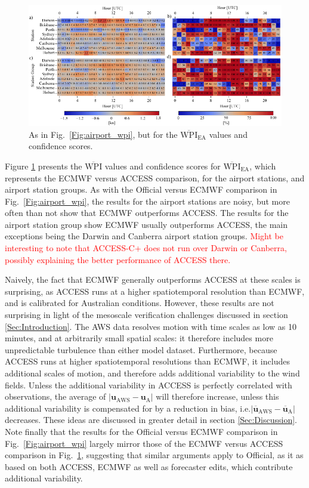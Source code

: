 \documentclass{ametsoc}
\begin{document}
\begin{figure}
\centering
\includegraphics[width=39pc]{airport_wpi_EA.pdf}
\caption{As in Fig.~\ref{Fig:airport_wpi}, but for the $\overline{\text{WPI}}_\text{EA}$ values and confidence scores.}
\label{Fig:airport_wpi_EA}
\end{figure}

Figure \ref{Fig:airport_wpi_EA} presents the $\overline{\text{WPI}}$ values and confidence scores for $\overline{\text{WPI}}_\text{EA}$, which represents the ECMWF versus ACCESS comparison, for the airport stations, and airport station groups. As with the Official versus ECMWF comparison in Fig.~\ref{Fig:airport_wpi}, the results for the airport stations are noisy, but more often than not show that ECMWF outperforms ACCESS. The results for the airport station group show ECMWF usually outperforms ACCESS, the main exceptions being the Darwin and Canberra airport station groups. \textcolor{red}{Might be interesting to note that ACCESS-C+ does not run over Darwin or Canberra, possibly explaining the better performance of ACCESS there.}

Naively, the fact that ECMWF generally outperforms ACCESS at these scales is surprising, as ACCESS runs at a higher spatiotemporal resolution than ECMWF, and is calibrated for Australian conditions. However, these results are not surprising in light of the mesoscale verification challenges discussed in section \ref{Sec:Introduction}. The AWS data resolves motion with time scales as low as 10 minutes, and at arbitrarily small spatial scales: it therefore includes more unpredictable turbulence than either model dataset. Furthermore, because ACCESS runs at higher spatiotemporal resolutions than ECMWF, it includes additional scales of motion, and therefore adds additional variability to the wind fields. Unless the additional variability in ACCESS is perfectly correlated with observations, the average of $\left\lvert \boldsymbol{u}_{\text{AWS}}-\boldsymbol{u}_{\text{A}} \right\rvert$
will therefore increase, unless this additional variability is compensated for by a reduction in bias, i.e.$\left\lvert \overline{\boldsymbol{u}}_{\text{AWS}}-\overline{\boldsymbol{u}}_{\text{A}} \right\rvert$ decreases. These ideas are discussed in greater detail in section \ref{Sec:Discussion}. Note finally that the results for the Official versus ECMWF comparison in Fig.~\ref{Fig:airport_wpi} largely mirror those of the ECMWF versus ACCESS comparison in Fig.~\ref{Fig:airport_wpi_EA}, suggesting that similar arguments apply to Official, as it as based on both ACCESS, ECMWF as well as forecaster edits, which contribute additional variability.  
\end{document}
